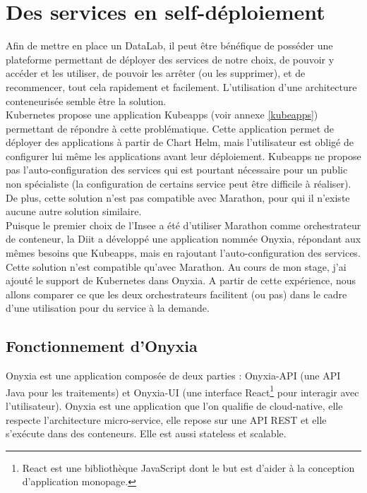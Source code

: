 \documentclass[11pt,fleqn]{book} %
\begin{document}
\chapter{Des services en self-déploiement}
\vspace{-2cm}
Afin de mettre en place un DataLab, il peut être bénéfique de posséder une plateforme permettant de déployer des services de notre choix, de pouvoir y accéder et les utiliser, de pouvoir les arrêter (ou les supprimer), et de recommencer, tout cela rapidement et facilement. L'utilisation d'une architecture conteneurisée semble être la solution.\\

Kubernetes propose une application Kubeapps (voir annexe \ref{kubeapps}) permettant de répondre à cette problématique. Cette application permet de déployer des applications à partir de Chart Helm, mais l'utilisateur est obligé de configurer lui même les applications avant leur déploiement. Kubeapps ne propose pas l'auto-configuration des services qui est pourtant nécessaire pour un public non spécialiste (la configuration de certains service peut être difficile à réaliser). De plus, cette solution n'est pas compatible avec Marathon, pour qui il n'existe aucune autre solution similaire.\\

Puisque le premier choix de l'Insee a été d'utiliser Marathon comme orchestrateur de conteneur, la Diit a développé une application nommée Onyxia, répondant aux mêmes besoins que Kubeapps, mais en rajoutant l'auto-configuration des services. Cette solution n'est compatible qu'avec Marathon. Au cours de mon stage, j'ai ajouté le support de Kubernetes dans Onyxia. A partir de cette expérience, nous allons comparer ce que les deux orchestrateurs facilitent (ou pas) dans le cadre d'une utilisation pour du service à la demande.

\section{Fonctionnement d'Onyxia}
Onyxia est une application composée de deux parties : Onyxia-API (une API Java pour les traitements) et Onyxia-UI (une interface React\footnote{React est une bibliothèque JavaScript dont le but est d'aider à la conception d'application monopage.} pour interagir avec l'utilisateur). Onyxia est une application que l'on qualifie de cloud-native, elle respecte l'architecture micro-service, elle repose sur une API REST et elle s'exécute dans des conteneurs. Elle est aussi stateless et scalable.\\
\end{document}
